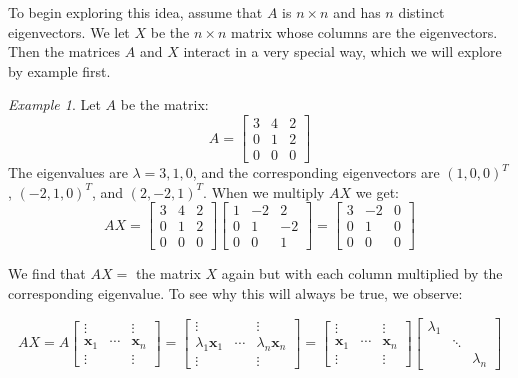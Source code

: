 \documentclass[11pt,oneside]{amsbook}
\theoremstyle{definition}
\theoremstyle{plain}
\theoremstyle{definition}
\theoremstyle{remark}
\newtheorem{example}[theorem]{Example}
\numberwithin{equation}{section}
\numberwithin{figure}{section}
\begin{document}
To begin exploring this idea, assume that $A$ is $n\times n$ and has $n$ distinct eigenvectors. We let $X$ be the $n\times n$ matrix whose columns are the eigenvectors. Then the matrices $A$ and $X$ interact in a very special way, which we will explore by example first.

\begin{example}
  Let $A$ be the matrix:
  \[A=\begin{bmatrix}
      3 & 4 & 2 \\
      0 & 1 & 2 \\
      0 & 0 & 0
      \end{bmatrix}
  \]
  The eigenvalues are $\lambda=3,1,0$, and the corresponding eigenvectors are $(1,0,0)^T$, $(-2,1,0)^T$, and $(2,-2,1)^T$. When we multiply $AX$ we get:
  \[AX=\begin{bmatrix}
      3 & 4 & 2 \\
      0 & 1 & 2 \\
      0 & 0 & 0
    \end{bmatrix}
    \begin{bmatrix}
      1 & -2 & 2 \\
      0 & 1 & -2 \\
      0 & 0 & 1
    \end{bmatrix}
    =
    \begin{bmatrix}
      3 & -2 & 0 \\
      0 & 1 & 0 \\
      0 & 0 & 0
    \end{bmatrix}      
  \]
\end{example}

We find that $AX=$ the matrix $X$ again but with each column multiplied by the corresponding eigenvalue. To see why this will always be true, we observe:

\[AX=A\begin{bmatrix}
    \vdots&&\vdots\\
    \mathbf{x}_1&\cdots&\mathbf{x}_n\\
    \vdots&&\vdots
  \end{bmatrix}
  =\begin{bmatrix}
    \vdots&&\vdots\\
    \lambda_1\mathbf{x}_1&\cdots&\lambda_n\mathbf{x}_n\\
    \vdots&&\vdots
  \end{bmatrix}
  =\begin{bmatrix}
    \vdots&&\vdots\\
    \mathbf{x}_1&\cdots&\mathbf{x}_n\\
    \vdots&&\vdots
  \end{bmatrix}
  \begin{bmatrix}
    \lambda_1\\&\ddots&\\&&\lambda_n
  \end{bmatrix}
\]
\end{document}
